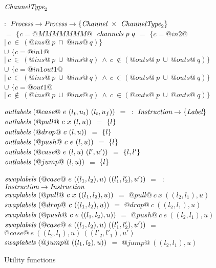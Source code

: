 
\begin{figure}

\begin{tabbing}
$\textit{ChannelType}_2$   \TABDEF \kill

 \> $:$ \> $\textit{Process} \to \textit{Process} \to \{\textit{Channel} ~\times~ \textit{ChannelType}_2\}$ \\

  \> $=$    \> $\{ c=@MMMMMMM@~$\= \kill
$\textit{channels}~p~q$
  \> $=$    \> $\{ c=@in2@$
            \> $|~c~\in~(@ins@~p~\cap~@ins@~q) \}$ \\

  \> $\cup$ \> $\{ c=@in1@$
            \> $ |~c~\in~(@ins@~p~\cup~@ins@~q)~\wedge~c~\not\in(@outs@~p~\cup~@outs@~q) \}$ \\

  \> $\cup$ \> $\{ c=@in1out1@$
            \> $|~c~\in~(@ins@~p~\cup~@ins@~q)~\wedge~c~\in(@outs@~p~\cup~@outs@~q) \}$ \\

  \> $\cup$ \> $\{ c=@out1@$
            \> $ |~c~\not\in~(@ins@~p~\cup~@ins@~q)~\wedge~c~\in(@outs@~p~\cup~@outs@~q) \}$ \\
\end{tabbing}

\newcommand\funClauseDef[3]
{ $\ti{#1}~(#2)$ \> $=$ \> $#3$ \\
}
\newcommand\outlabelsDef[2]
{ \funClauseDef{outlabels}{#1}{\sgl{#2}} 
}

\begin{tabbing}
$\textit{outlabels}~(@case@~e~(l_t,u_t)~(l_t,u_f))$ \TABSKIP $=$ \TABSKIP \kill
{} \> $~:$ \> $\textit{Instruction} \to \{ \textit{Label} \}$ \\
\outlabelsDef{@pull@~c~x~(l,u)}{l}
\outlabelsDef{@drop@~c~(l,u)}{l}
\outlabelsDef{@push@~c~e~(l,u)}{l}
\outlabelsDef{@case@~e~(l,u)~(l',u')}{l, l'}
\outlabelsDef{@jump@~(l,u)}{l}
\end{tabbing}

\begin{tabbing}
$\textit{swaplabels}~(@case@~e~((l_1,l_2),u)~((l'_1,l'_2),u'))$ \TABSKIP $=$ \TABSKIP \kill
{} \> $~:$ \> $\textit{Instruction} \to \textit{Instruction}$ \\
\funClauseDef{swaplabels}
  {@pull@~c~x~((l_1,l_2),u)}
  {@pull@~c~x~((l_2,l_1),u)}
\funClauseDef{swaplabels}
  {@drop@~c~((l_1,l_2),u)}
  {@drop@~c~((l_2,l_1),u)}
\funClauseDef{swaplabels}
  {@push@~c~e~((l_1,l_2),u)}
  {@push@~c~e~((l_2,l_1),u)}
\funClauseDef{swaplabels}
  {@case@~e~((l_1,l_2),u)~((l'_1,l'_2),u')}
  {@case@~e~((l_2,l_1),u)~((l'_2,l'_1),u')}
\funClauseDef{swaplabels}
  {@jump@~((l_1,l_2),u)}
  {@jump@~((l_2,l_1),u)}
\end{tabbing}

\caption{Utility functions}
\label{fig:Fusion:Utils}
\end{figure}

